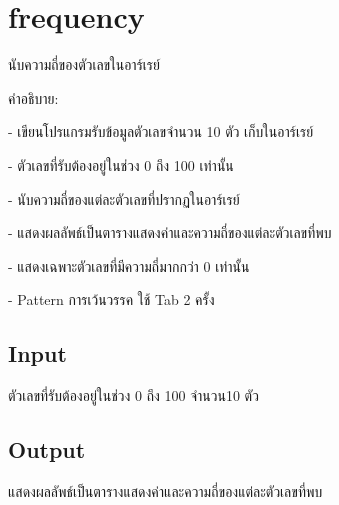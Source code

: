 \documentclass{article}
\begin{document}
\section*{frequency}

นับความถี่ของตัวเลขในอาร์เรย์



คำอธิบาย:



- เขียนโปรแกรมรับข้อมูลตัวเลขจำนวน 10 ตัว เก็บในอาร์เรย์



- ตัวเลขที่รับต้องอยู่ในช่วง 0 ถึง 100 เท่านั้น



- นับความถี่ของแต่ละตัวเลขที่ปรากฏในอาร์เรย์



- แสดงผลลัพธ์เป็นตารางแสดงค่าและความถี่ของแต่ละตัวเลขที่พบ



- แสดงเฉพาะตัวเลขที่มีความถี่มากกว่า 0 เท่านั้น



- Pattern การเว้นวรรค ใช้ Tab 2 ครั้ง



\subsection*{Input}
{ตัวเลขที่รับต้องอยู่ในช่วง 0 ถึง 100 จำนวน{10 ตัว}}\\



\subsection*{Output}
{แสดงผลลัพธ์เป็นตารางแสดงค่าและความถี่ของแต่ละตัวเลขที่พบ}\\
\end{document}
